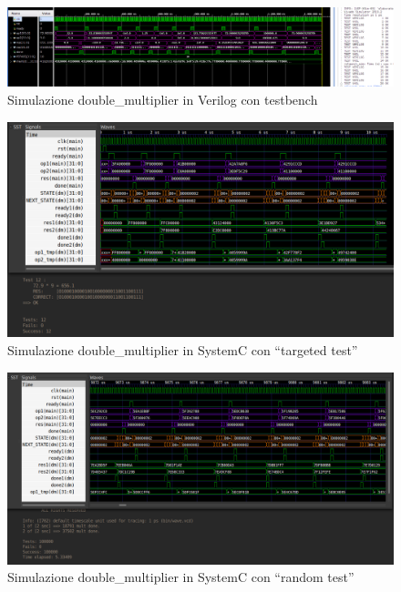 \documentclass[]{IEEEtran}
\begin{document}
\begin{figure}[bt]
    \centering
    \includegraphics[width=\textwidth]{figures/sim_testbench}
    \caption{Simulazione double\_multiplier in Verilog con testbench}
    \label{fig:SIM_TESTBENCH}
\end{figure}

\begin{figure}[bt]
    \centering
    \includegraphics[width=\textwidth]{figures/sim_systemc_target}
    \caption{Simulazione double\_multiplier in SystemC con ``targeted test''}
    \label{fig:SIM_SC_TARGET}
\end{figure}

\begin{figure}[bt]
    \centering
    \includegraphics[width=\textwidth]{figures/sim_systemc_rnd}
    \caption{Simulazione double\_multiplier in SystemC con ``random test''}
    \label{fig:SIM_SC_RND}
\end{figure}
\end{document}
